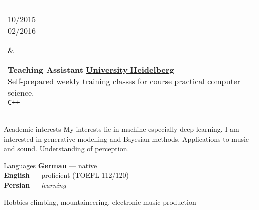 \documentclass{article}
\newenvironment{entrylist}{
	\begin{longtable}[H]{l l}
}{
	\end{longtable}
}
\newcommand{\entry}[4]{%
	\parbox[t]{0.175\linewidth}{#1} &
	\parbox[t]{0.825\linewidth}{
		\textbf{#2}%
		\hfill%
		{\footnotesize \textbf{\textcolor{black}{#3}}}\\%
		{\small #4} %
    }\\\\}
\newcommand{\slashsep}{\hspace{2mm}/\hspace{2mm}}
\begin{document}
\begin{entrylist}
    \entry
    {10/2015--\\02/2016}
    {Teaching Assistant}
    {\href{https://www.uni-heidelberg.de/en}{University Heidelberg}}
    {
        Self-prepared weekly training classes for course practical computer science.\\
        \texttt{C++}
    }

    \entry
    {06/2015--}
    {CO-Founder\ /\ Voluntary work}
    {\href{https://collegiumacademicum.de}{Collegium Academicum, Heidelberg}}
    {
        Student-founded non-profit company building sustainable student housing.
        We are building an innovative living space for 200 young people.
        Creating an educational center for holistic self-learning.\\
        \texttt{team building}\slashsep\texttt{lead generation}\slashsep\texttt{design work}\slashsep\texttt{writing grant applications}
    }
\end{entrylist}

\begin{cvbox}{Academic interests}
My interests lie in machine especially deep learning. I am interested in generative modelling and
Bayesian methods. Applications to music and sound. Understanding of perception.
\end{cvbox}
\begin{cvbox}{Languages}
	\textbf{German} --- native\\
	\textbf{English} --- proficient (TOEFL 112/120)\\
    \textbf{Persian} --- \textit{learning}
\end{cvbox}
\begin{cvbox}{Hobbies}
    climbing, mountaineering, electronic music production
\end{cvbox}
\end{document}
